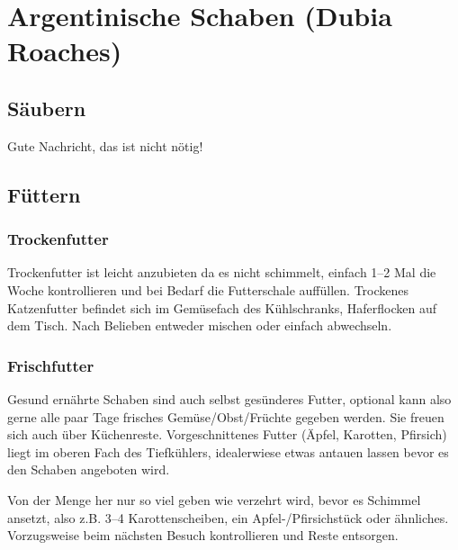 \chapter{Argentinische Schaben (Dubia Roaches)}

\section{Säubern}
Gute Nachricht, das ist nicht nötig!

\section{Füttern}

\subsection{Trockenfutter}
Trockenfutter ist leicht anzubieten da es nicht schimmelt, einfach 1--2 Mal die Woche kontrollieren
und bei Bedarf die Futterschale auffüllen.
Trockenes Katzenfutter befindet sich im Gemüsefach des Kühlschranks, Haferflocken auf dem Tisch.
Nach Belieben entweder mischen oder einfach abwechseln.

\subsection{Frischfutter}
Gesund ernährte Schaben sind auch selbst gesünderes Futter, optional kann also gerne alle paar Tage
frisches Gemüse/Obst/Früchte gegeben werden. Sie freuen sich auch über Küchenreste.
Vorgeschnittenes Futter (Äpfel, Karotten, Pfirsich) liegt im oberen Fach des Tiefkühlers,
idealerwiese etwas antauen lassen bevor es den Schaben angeboten wird.

Von der Menge her nur so viel geben wie verzehrt wird, bevor es Schimmel ansetzt,
also z.B. 3--4 Karottenscheiben, ein Apfel-/Pfirsichstück oder ähnliches.
Vorzugsweise beim nächsten Besuch kontrollieren und Reste entsorgen.

